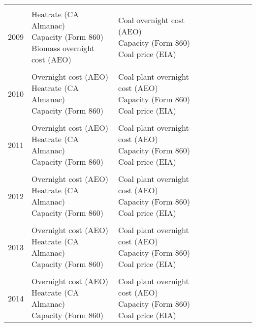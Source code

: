 \documentclass[10pt]{report}
\begin{document}
\begin{scriptsize}
\begin{landscape}
\begin{center}
\begin{longtable}{|lllllllll|}
\hline \\
2009 & \shortstack{Heatrate (CA Almanac) \\ Capacity (Form 860) \\ Biomass overnight cost (AEO) } &
\shortstack{Coal overnight cost (AEO) \\ Capacity (Form 860) \\ Coal price (EIA)} & \\
\hline \\
2010 & \shortstack{Overnight cost (AEO) \\ Heatrate (CA Almanac) \\ Capacity (Form 860)} &
\shortstack{Coal plant overnight cost (AEO) \\ Capacity (Form 860) \\ Coal price (EIA)} & \\
\hline \\
2011 & \shortstack{Overnight cost (AEO) \\ Heatrate (CA Almanac) \\ Capacity (Form 860)} &
\shortstack{Coal plant overnight cost (AEO) \\ Capacity (Form 860) \\ Coal price (EIA)} & \\
\hline \\
2012 & \shortstack{Overnight cost (AEO) \\ Heatrate (CA Almanac) \\ Capacity (Form 860)} &
\shortstack{Coal plant overnight cost (AEO) \\ Capacity (Form 860) \\ Coal price (EIA)} & \\
\hline \\
2013 & \shortstack{Overnight cost (AEO) \\ Heatrate (CA Almanac) \\ Capacity (Form 860)} &
\shortstack{Coal plant overnight cost (AEO) \\ Capacity (Form 860) \\ Coal price (EIA)} & \\
\hline \\
2014 & \shortstack{Overnight cost (AEO) \\ Heatrate (CA Almanac) \\ Capacity (Form 860)} &
\shortstack{Coal plant overnight cost (AEO) \\ Capacity (Form 860) \\ Coal price (EIA)} & \\

\end{longtable}
\end{center}
\end{landscape}
\end{scriptsize}
\end{document}
